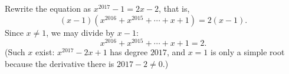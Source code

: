 Rewrite the equation as $x^{2017}-1=2x-2$, that is,
\[(x-1)\left(x^{2016}+x^{2015}+\cdots+x+1\right)=2(x-1).\]
Since $x\ne1$, we may divide by $x-1$:
\[x^{2016}+x^{2015}+\cdots+x+1=\boxed{2}.\]
(Such $x$ exist: $x^{2017}-2x+1$ has degree $2017$, and $x=1$ is only a simple root because the derivative there is $2017-2\ne0$.)
